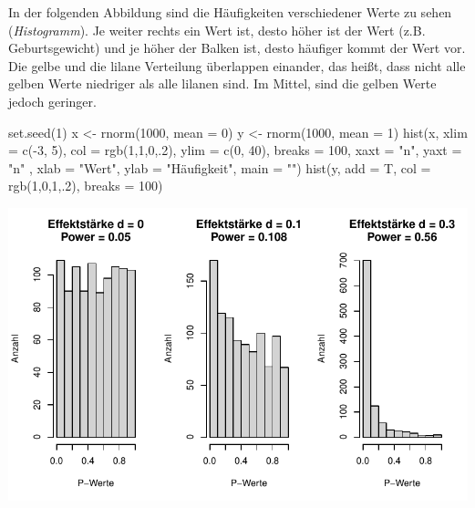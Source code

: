 \documentclass[
  letterpaper,
  DIV=11,
  numbers=noendperiod]{scrreprt}
\newenvironment{Shaded}{\begin{snugshade}}{\end{snugshade}}
\newcommand{\AttributeTok}[1]{\textcolor[rgb]{0.40,0.45,0.13}{#1}}
\newcommand{\DecValTok}[1]{\textcolor[rgb]{0.68,0.00,0.00}{#1}}
\newcommand{\FunctionTok}[1]{\textcolor[rgb]{0.28,0.35,0.67}{#1}}
\newcommand{\NormalTok}[1]{\textcolor[rgb]{0.00,0.23,0.31}{#1}}
\newcommand{\OtherTok}[1]{\textcolor[rgb]{0.00,0.23,0.31}{#1}}
\newcommand{\SpecialCharTok}[1]{\textcolor[rgb]{0.37,0.37,0.37}{#1}}
\newcommand{\StringTok}[1]{\textcolor[rgb]{0.13,0.47,0.30}{#1}}
\begin{document}
In der folgenden Abbildung sind die Häufigkeiten verschiedener Werte zu
sehen (\emph{Histogramm}). Je weiter rechts ein Wert ist, desto höher
ist der Wert (z.B. Geburtsgewicht) und je höher der Balken ist, desto
häufiger kommt der Wert vor. Die gelbe und die lilane Verteilung
überlappen einander, das heißt, dass nicht alle gelben Werte niedriger
als alle lilanen sind. Im Mittel, sind die gelben Werte jedoch geringer.

\begin{Shaded}
\begin{Highlighting}[]
\FunctionTok{set.seed}\NormalTok{(}\DecValTok{1}\NormalTok{)}
\NormalTok{x }\OtherTok{\textless{}{-}} \FunctionTok{rnorm}\NormalTok{(}\DecValTok{1000}\NormalTok{, }\AttributeTok{mean =} \DecValTok{0}\NormalTok{)}
\NormalTok{y }\OtherTok{\textless{}{-}} \FunctionTok{rnorm}\NormalTok{(}\DecValTok{1000}\NormalTok{, }\AttributeTok{mean =} \DecValTok{1}\NormalTok{)}
\FunctionTok{hist}\NormalTok{(x, }\AttributeTok{xlim =} \FunctionTok{c}\NormalTok{(}\SpecialCharTok{{-}}\DecValTok{3}\NormalTok{, }\DecValTok{5}\NormalTok{), }\AttributeTok{col =} \FunctionTok{rgb}\NormalTok{(}\DecValTok{1}\NormalTok{,}\DecValTok{1}\NormalTok{,}\DecValTok{0}\NormalTok{,.}\DecValTok{2}\NormalTok{), }\AttributeTok{ylim =} \FunctionTok{c}\NormalTok{(}\DecValTok{0}\NormalTok{, }\DecValTok{40}\NormalTok{), }\AttributeTok{breaks =} \DecValTok{100}\NormalTok{, }\AttributeTok{xaxt =} \StringTok{"n"}\NormalTok{, }\AttributeTok{yaxt =} \StringTok{"n"}
\NormalTok{     , }\AttributeTok{xlab =} \StringTok{"Wert"}\NormalTok{, }\AttributeTok{ylab =} \StringTok{"Häufigkeit"}\NormalTok{, }\AttributeTok{main =} \StringTok{""}\NormalTok{)}
\FunctionTok{hist}\NormalTok{(y, }\AttributeTok{add =}\NormalTok{ T, }\AttributeTok{col =} \FunctionTok{rgb}\NormalTok{(}\DecValTok{1}\NormalTok{,}\DecValTok{0}\NormalTok{,}\DecValTok{1}\NormalTok{,.}\DecValTok{2}\NormalTok{), }\AttributeTok{breaks =} \DecValTok{100}\NormalTok{)}
\end{Highlighting}
\end{Shaded}

\includegraphics{probleme_methoden_files/figure-pdf/unnamed-chunk-1-1.pdf}
\end{document}
